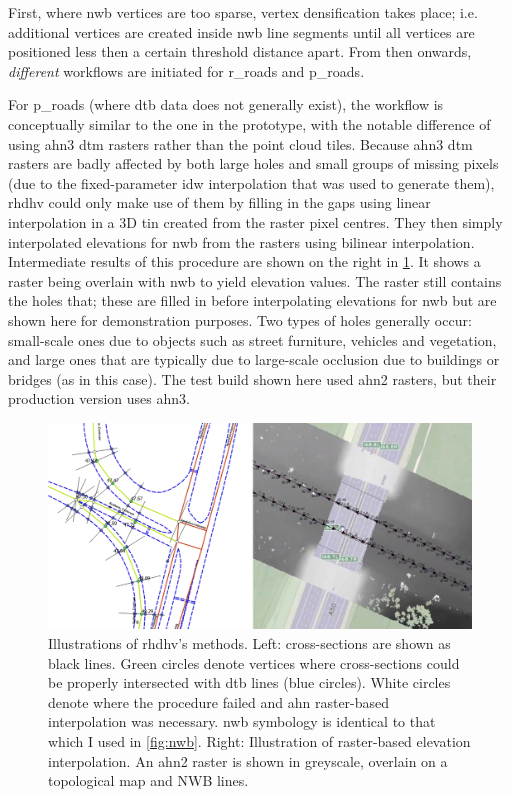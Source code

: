 First, where \ac{nwb} vertices are too sparse, vertex densification takes place; i.e. additional vertices are created inside \ac{nwb} line segments until all vertices are positioned less then a certain threshold distance apart. From then onwards, \textit{different} workflows are initiated for \ac{r_roads} and \ac{p_roads}.

For \ac{p_roads} (where \ac{dtb} data does not generally exist), the workflow is conceptually similar to the one in the prototype, with the notable difference of using \ac{ahn3} \ac{dtm} rasters rather than the point cloud tiles. Because \ac{ahn3} \ac{dtm} rasters are badly affected by both large holes and small groups of missing pixels (due to the fixed-parameter \ac{idw} interpolation that was used to generate them), \ac{rhdhv} could only make use of them by filling in the gaps using linear interpolation in a 3D \ac{tin} created from the raster pixel centres. They then simply interpolated elevations for \ac{nwb} from the rasters using bilinear interpolation. Intermediate results of this procedure are shown on the right in \ref{fig:rhdhv}. It shows a raster being overlain with \ac{nwb} to yield elevation values. The raster still contains the holes that; these are filled in before interpolating elevations for \ac{nwb} but are shown here for demonstration purposes. Two types of holes generally occur: small-scale ones due to objects such as street furniture, vehicles and vegetation, and large ones that are typically due to large-scale occlusion due to buildings or bridges (as in this case). The test build shown here used \ac{ahn2} rasters, but their production version uses \ac{ahn3}.

\begin{figure}
    \centering
    \includegraphics[width=\linewidth]{final_report/figs/rhdhv_combined.png}
    \caption[Illustrations of the workflows of the commercial implementation]{Illustrations of \ac{rhdhv}'s methods. Left: cross-sections are shown as black lines. Green circles denote vertices where cross-sections could be properly intersected with \ac{dtb} lines (blue circles). White circles denote where the procedure failed and \ac{ahn} raster-based interpolation was necessary. \ac{nwb} symbology is identical to that which I used in \ref{fig:nwb}. Right: Illustration of raster-based elevation interpolation. An \ac{ahn2} raster is shown in greyscale, overlain on a topological map and NWB lines.}
    \label{fig:rhdhv}
\end{figure}

